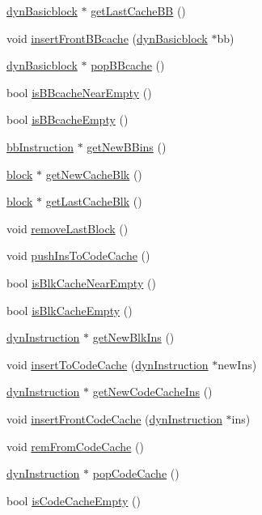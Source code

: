 \begin{DoxyCompactItemize}
\item 
\hyperlink{classdynBasicblock}{dynBasicblock} $\ast$ \hyperlink{structg__variable_a87e0d4278533d81d2ec6a4edd9fa1c20}{getLastCacheBB} ()
\item 
void \hyperlink{structg__variable_a6c7ff60217a53698cce497bf705cd0c8}{insertFrontBBcache} (\hyperlink{classdynBasicblock}{dynBasicblock} $\ast$bb)
\item 
\hyperlink{classdynBasicblock}{dynBasicblock} $\ast$ \hyperlink{structg__variable_a919a79fc6f8adce82772a72d3e62a20b}{popBBcache} ()
\item 
bool \hyperlink{structg__variable_af56609b1e0566a976487eee39e0283ef}{isBBcacheNearEmpty} ()
\item 
bool \hyperlink{structg__variable_a2192ac9bd012be515c0d8d9fbea8b196}{isBBcacheEmpty} ()
\item 
\hyperlink{classbbInstruction}{bbInstruction} $\ast$ \hyperlink{structg__variable_a6c27ed49f59faca6b9629a98993ee33e}{getNewBBins} ()
\item 
\hyperlink{classblock}{block} $\ast$ \hyperlink{structg__variable_ac1662ac572ac7ec07e7f19117eedb872}{getNewCacheBlk} ()
\item 
\hyperlink{classblock}{block} $\ast$ \hyperlink{structg__variable_a326ca8b03f7572a3c402fb676b62213b}{getLastCacheBlk} ()
\item 
void \hyperlink{structg__variable_adaeb84094d83af19c60250b0ccbf37b0}{removeLastBlock} ()
\item 
void \hyperlink{structg__variable_aaf1ffcbfc128bd4fab10f4f745356c9b}{pushInsToCodeCache} ()
\item 
bool \hyperlink{structg__variable_afa7c4ed5cce9932b26d4a902e986e774}{isBlkCacheNearEmpty} ()
\item 
bool \hyperlink{structg__variable_a9e68ff9df2202d65d28f5f0d07d2e7d0}{isBlkCacheEmpty} ()
\item 
\hyperlink{classdynInstruction}{dynInstruction} $\ast$ \hyperlink{structg__variable_a5a35ada5b3465ce46d8e3badf53d720b}{getNewBlkIns} ()
\item 
void \hyperlink{structg__variable_a7816cdec0039f6a6dfb2c7a278aa0db4}{insertToCodeCache} (\hyperlink{classdynInstruction}{dynInstruction} $\ast$newIns)
\item 
\hyperlink{classdynInstruction}{dynInstruction} $\ast$ \hyperlink{structg__variable_a8ba648162a8abae37194625703d094c9}{getNewCodeCacheIns} ()
\item 
void \hyperlink{structg__variable_ac6cd30370c34c5a0862aa9a4c56049db}{insertFrontCodeCache} (\hyperlink{classdynInstruction}{dynInstruction} $\ast$ins)
\item 
void \hyperlink{structg__variable_ab351194ce2a3de088813ae861c7e3d10}{remFromCodeCache} ()
\item 
\hyperlink{classdynInstruction}{dynInstruction} $\ast$ \hyperlink{structg__variable_abb078ae60bb65db485a0cc2382bd4457}{popCodeCache} ()
\item 
bool \hyperlink{structg__variable_a4b5f6627f388c34df7af5168a119778d}{isCodeCacheEmpty} ()
\end{DoxyCompactItemize}
